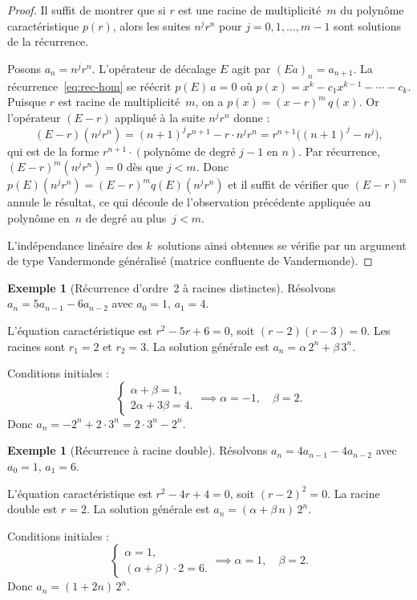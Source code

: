 \documentclass[12pt,a4paper,openany]{book}
\theoremstyle{definition}
\newtheorem{exemple}[definition]{Exemple}
\theoremstyle{plain}
\theoremstyle{remark}
\begin{document}
\begin{proof}
Il suffit de montrer que si $r$ est une racine de multiplicité~$m$ du polynôme
caractéristique $p(r)$, alors les suites $n^j r^n$ pour $j = 0, 1, \ldots, m-1$
sont solutions de la récurrence.

Posons $a_n = n^j r^n$. L'opérateur de décalage $E$ agit par $(Ea)_n = a_{n+1}$.
La récurrence~\eqref{eq:rec-hom} se réécrit $p(E)\, a = 0$ où
$p(x) = x^k - c_1 x^{k-1} - \cdots - c_k$. Puisque $r$ est racine de
multiplicité~$m$, on a $p(x) = (x - r)^m\, q(x)$. Or l'opérateur $(E - r)$
appliqué à la suite $n^j r^n$ donne :
\[
  (E - r)(n^j r^n) = (n+1)^j r^{n+1} - r \cdot n^j r^n
  = r^{n+1}\bigl((n+1)^j - n^j\bigr),
\]
qui est de la forme $r^{n+1} \cdot (\text{polynôme de degré } j-1 \text{ en } n)$.
Par récurrence, $(E - r)^m (n^j r^n) = 0$ dès que $j < m$. Donc
$p(E)(n^j r^n) = (E-r)^m q(E)(n^j r^n)$ et il suffit de vérifier que
$(E-r)^m$ annule le résultat, ce qui découle de l'observation précédente
appliquée au polynôme en~$n$ de degré au plus~$j < m$.

L'indépendance linéaire des $k$~solutions ainsi obtenues se vérifie par un
argument de type Vandermonde généralisé (matrice confluente de Vandermonde).
\end{proof}

\begin{exemple}[Récurrence d'ordre~2 à racines distinctes]
\label{ex:rec-ordre2-distinctes}
Résolvons $a_n = 5a_{n-1} - 6a_{n-2}$ avec $a_0 = 1$, $a_1 = 4$.

L'équation caractéristique est $r^2 - 5r + 6 = 0$, soit $(r-2)(r-3) = 0$.
Les racines sont $r_1 = 2$ et $r_2 = 3$. La solution générale est
$a_n = \alpha\, 2^n + \beta\, 3^n$.

Conditions initiales :
\[
  \begin{cases} \alpha + \beta = 1, \\ 2\alpha + 3\beta = 4. \end{cases}
  \implies \alpha = -1,\quad \beta = 2.
\]
Donc $a_n = -2^n + 2 \cdot 3^n = 2 \cdot 3^n - 2^n$.
\end{exemple}

\begin{exemple}[Récurrence à racine double]
\label{ex:rec-racine-double}
Résolvons $a_n = 4a_{n-1} - 4a_{n-2}$ avec $a_0 = 1$, $a_1 = 6$.

L'équation caractéristique est $r^2 - 4r + 4 = 0$, soit $(r - 2)^2 = 0$.
La racine double est $r = 2$. La solution générale est
$a_n = (\alpha + \beta\, n)\, 2^n$.

Conditions initiales :
\[
  \begin{cases} \alpha = 1, \\ (\alpha + \beta)\cdot 2 = 6. \end{cases}
  \implies \alpha = 1,\quad \beta = 2.
\]
Donc $a_n = (1 + 2n)\, 2^n$.
\end{exemple}
\end{document}
